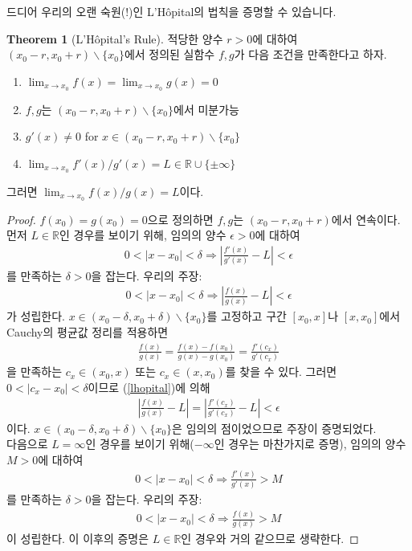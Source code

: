 \documentclass[12pt]{article}
\theoremstyle{definition}
\newtheorem{thm}{Theorem}[section]
\def\RR{\mathbb{R}}
\def\eps{\epsilon}
\newcommand{\abs}[1]{\left\vert#1\right\vert}
\begin{document}
드디어 우리의 오랜 숙원(!)인 L'H\^opital의 법칙을 증명할 수 있습니다.

\begin{thm} [L'H\^opital's Rule] \label{lopthm}
	적당한 양수 \(r > 0\)에 대하여 \((x_0 - r, x_0 + r) \backslash \{x_0\}\)에서 정의된 실함수 \(f, g\)가 다음 조건을 만족한다고 하자.
	\begin{enumerate}[label=(\alph*), leftmargin=2\parindent]
		\item
		\(\lim_{x \rightarrow x_0} f(x) = \lim_{x \rightarrow x_0} g(x) = 0\)
		\item
		\(f, g\)는 \((x_0 - r, x_0 + r) \backslash \{x_0\}\)에서 미분가능
		\item
		\(g'(x) \neq 0\) for \(x \in (x_0 - r, x_0 + r) \backslash \{x_0\}\)
		\item
		\(\lim_{x \rightarrow x_0} f'(x) / g'(x) = L \in \RR \cup \{\pm \infty\}\)
	\end{enumerate}
	그러면 \(\lim_{x \rightarrow x_0} f(x) / g(x) = L\)이다.
\end{thm}

\begin{proof}
	\(f(x_0) = g(x_0) = 0\)으로 정의하면 \(f, g\)는 \((x_0 - r, x_0 + r)\)에서 연속이다.\\
	먼저 \(L \in \RR\)인 경우를 보이기 위해, 임의의 양수 \(\eps > 0\)에 대하여
	\begin{gather} \label{lhopital}
		0 < \abs{x - x_0} < \delta \Longrightarrow \abs{\frac{f'(x)}{g'(x)} - L} < \eps
	\end{gather}
	를 만족하는 \(\delta > 0\)을 잡는다. 우리의 주장:
	\begin{gather*}
		0 < \abs{x - x_0} < \delta \Longrightarrow \abs{\frac{f(x)}{g(x)} - L} < \eps
	\end{gather*}
	가 성립한다. \(x \in (x_0 - \delta, x_0 + \delta)\backslash\{x_0\}\)를 고정하고 구간 \([x_0, x]\)나 \([x, x_0]\)에서 Cauchy의 평균값 정리를 적용하면
	\begin{gather*}
		\frac{f(x)}{g(x)} = \frac{f(x) - f(x_0)}{g(x) - g(x_0)} = \frac{f'(c_x)}{g'(c_x)}
	\end{gather*}
	을 만족하는 \(c_x \in (x_0, x)\) 또는 \(c_x \in (x, x_0)\)를 찾을 수 있다. 그러면 \(0 < \abs{c_x - x_0} < \delta\)이므로 (\ref{lhopital})에 의해
	\begin{gather*}
		\abs{\frac{f(x)}{g(x)} - L} = \abs{\frac{f'(c_x)}{g'(c_x)} - L} < \eps
	\end{gather*}
	이다. \(x \in (x_0 - \delta, x_0 + \delta)\backslash\{x_0\}\)은 임의의 점이었으므로 주장이 증명되었다.\\
	다음으로 \(L = \infty\)인 경우를 보이기 위해(\(-\infty\)인 경우는 마찬가지로 증명), 임의의 양수 \(M > 0\)에 대하여
	\begin{gather*}
		0 < \abs{x - x_0} < \delta \Longrightarrow \frac{f'(x)}{g'(x)} > M
	\end{gather*}
	를 만족하는 \(\delta > 0\)을 잡는다. 우리의 주장:
	\begin{gather*}
		0 < \abs{x - x_0} < \delta \Longrightarrow \frac{f(x)}{g(x)} > M
	\end{gather*}
	이 성립한다. 이 이후의 증명은 \(L \in \RR\)인 경우와 거의 같으므로 생략한다.
\end{proof}
\end{document}
